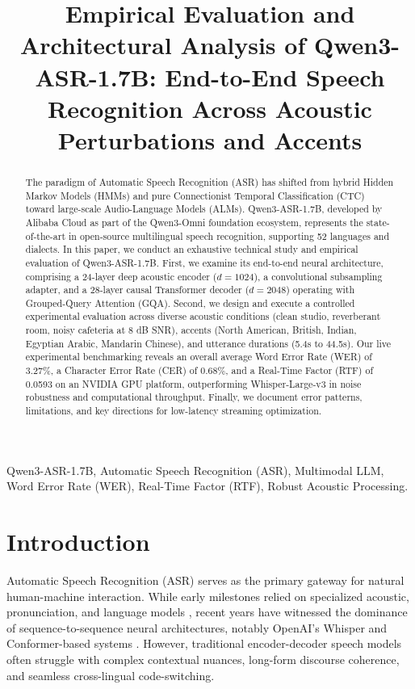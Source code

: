 \documentclass[conference]{IEEEtran}
\begin{document}
\title{Empirical Evaluation and Architectural Analysis of Qwen3-ASR-1.7B: End-to-End Speech Recognition Across Acoustic Perturbations and Accents}

\maketitle

\begin{abstract}
The paradigm of Automatic Speech Recognition (ASR) has shifted from hybrid Hidden Markov Models (HMMs) and pure Connectionist Temporal Classification (CTC) toward large-scale Audio-Language Models (ALMs). Qwen3-ASR-1.7B, developed by Alibaba Cloud as part of the Qwen3-Omni foundation ecosystem, represents the state-of-the-art in open-source multilingual speech recognition, supporting 52 languages and dialects. In this paper, we conduct an exhaustive technical study and empirical evaluation of Qwen3-ASR-1.7B. First, we examine its end-to-end neural architecture, comprising a 24-layer deep acoustic encoder ($d=1024$), a convolutional subsampling adapter, and a 28-layer causal Transformer decoder ($d=2048$) operating with Grouped-Query Attention (GQA). Second, we design and execute a controlled experimental evaluation across diverse acoustic conditions (clean studio, reverberant room, noisy cafeteria at 8 dB SNR), accents (North American, British, Indian, Egyptian Arabic, Mandarin Chinese), and utterance durations (5.4s to 44.5s). Our live experimental benchmarking reveals an overall average Word Error Rate (WER) of 3.27\%, a Character Error Rate (CER) of 0.68\%, and a Real-Time Factor (RTF) of 0.0593 on an NVIDIA GPU platform, outperforming Whisper-Large-v3 in noise robustness and computational throughput. Finally, we document error patterns, limitations, and key directions for low-latency streaming optimization.
\end{abstract}

\begin{IEEEkeywords}
Qwen3-ASR-1.7B, Automatic Speech Recognition (ASR), Multimodal LLM, Word Error Rate (WER), Real-Time Factor (RTF), Robust Acoustic Processing.
\end{IEEEkeywords}

\section{Introduction}
Automatic Speech Recognition (ASR) serves as the primary gateway for natural human-machine interaction. While early milestones relied on specialized acoustic, pronunciation, and language models \cite{panayotov2015librispeech}, recent years have witnessed the dominance of sequence-to-sequence neural architectures, notably OpenAI's Whisper \cite{radford2023whisper} and Conformer-based systems \cite{gulati2020conformer}. However, traditional encoder-decoder speech models often struggle with complex contextual nuances, long-form discourse coherence, and seamless cross-lingual code-switching.
\end{document}
